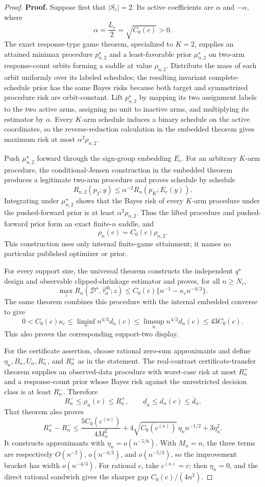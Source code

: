 \documentclass{article}
\begin{document}
\begin{proof}
\textbf{Proof.}
Suppose first that \(|S_c|=2\). Its active coefficients are \(\alpha\) and \(-\alpha\), where
\[
 \alpha=\frac{L_c}{2}=\sqrt{C_0(c)}>0.
\]
The exact response-type game theorem, specialized to \(K=2\), supplies an attained minimax procedure \(p_{n,2}^\star\) and a least-favorable prior \(\mu_{n,2}^\star\) on two-arm response-count orbits forming a saddle at value \(\rho_{n,2}\). Distribute the mass of each orbit uniformly over its labeled schedules; the resulting invariant complete-schedule prior has the same Bayes risks because both target and symmetrized procedure risk are orbit-constant. Lift \(p_{n,2}^\star\) by mapping its two assignment labels to the two active arms, assigning no unit to inactive arms, and multiplying its estimator by \(\alpha\). Every \(K\)-arm schedule induces a binary schedule on the active coordinates, so the reverse-reduction calculation in the embedded theorem gives maximum risk at most \(\alpha^2\rho_{n,2}\).

Push \(\mu_{n,2}^\star\) forward through the sign-group embedding \(E_c\). For an arbitrary \(K\)-arm procedure, the conditional-Jensen construction in the embedded theorem produces a legitimate two-arm procedure and proves schedule by schedule
\[
 R_{n,2}(p_2;y)\leq\alpha^{-2}R_n(p_K;E_c(y)).
\]
Integrating under \(\mu_{n,2}^\star\) shows that the Bayes risk of every \(K\)-arm procedure under the pushed-forward prior is at least \(\alpha^2\rho_{n,2}\). Thus the lifted procedure and pushed-forward prior form an exact finite-\(n\) saddle, and
\[
 \rho_n(c)=C_0(c)\rho_{n,2}.
\]
This construction uses only internal finite-game attainment; it names no particular published optimizer or prior.

For every support size, the universal theorem constructs the independent \(q^\star\) design and observable clipped-shrinkage estimator and proves, for all \(n\geq N_c\),
\[
 \max_zR_n(\mathcal D^\star,\widehat\tau_n^{\mathrm{sh}};z)
 \leq C_0(c)\{n^{-1}-\kappa_cn^{-4/3}\}.
\]
The same theorem combines this procedure with the internal embedded converse to give
\[
 0<C_0(c)\kappa_c
 \leq\liminf_n n^{4/3}d_n(c)
 \leq\limsup_n n^{4/3}d_n(c)
 \leq43C_0(c).
\]
This also proves the corresponding support-two display.

For the certificate assertion, choose rational zero-sum approximants and define \(\eta_n,B_n,U_n,R_n^-\), and \(R_n^+\) as in the statement. The real-contrast certificate-transfer theorem supplies an observed-data procedure with worst-case risk at most \(R_n^+\) and a response-count prior whose Bayes risk against the unrestricted decision class is at least \(R_n^-\). Therefore
\[
 R_n^-\leq\rho_n(c)\leq R_n^+,
 \qquad
 \underline d_n\leq d_n(c)\leq\overline d_n.
\]
That theorem also proves
\[
 R_n^+-R_n^-
 \leq\frac{5C_0(c^{(n)})}{4M_n^2}
 +4\sqrt{C_0(c^{(n)})}\,\eta_nn^{-1/2}+3\eta_n^2.
\]
It constructs approximants with \(\eta_n=o(n^{-5/6})\). With \(M_n=n\), the three terms are respectively \(O(n^{-2})\), \(o(n^{-4/3})\), and \(o(n^{-5/3})\), so the improvement bracket has width \(o(n^{-4/3})\). For rational \(c\), take \(c^{(n)}=c\); then \(\eta_n=0\), and the direct rational sandwich gives the sharper gap \(C_0(c)/(4n^2)\).


\end{proof}
\end{document}
